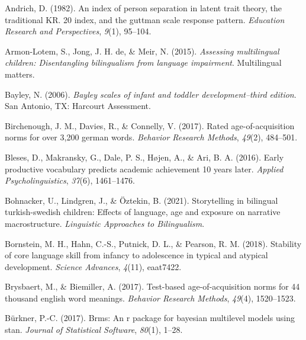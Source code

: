 \documentclass[
  man,floatsintext]{apa6}
\newlength{\cslhangindent}
\newlength{\cslentryspacingunit} %
\newenvironment{CSLReferences}[2] %
 {%
  \setlength{\parindent}{0pt}
  \ifodd #1
  \let\oldpar\par
  \def\par{\hangindent=\cslhangindent\oldpar}
  \fi
  \setlength{\parskip}{#2\cslentryspacingunit}
 }%
 {}
\begin{document}
\hypertarget{refs}{}
\begin{CSLReferences}{1}{0}
\leavevmode{}%
Andrich, D. (1982). An index of person separation in latent trait theory, the traditional KR. 20 index, and the guttman scale response pattern. \emph{Education Research and Perspectives}, \emph{9}(1), 95--104.

\leavevmode{}%
Armon-Lotem, S., Jong, J. H. de, \& Meir, N. (2015). \emph{Assessing multilingual children: Disentangling bilingualism from language impairment}. Multilingual matters.

\leavevmode{}%
Bayley, N. (2006). \emph{Bayley scales of infant and toddler development--third edition}. San Antonio, TX: Harcourt Assessment.

\leavevmode{}%
Birchenough, J. M., Davies, R., \& Connelly, V. (2017). Rated age-of-acquisition norms for over 3,200 german words. \emph{Behavior Research Methods}, \emph{49}(2), 484--501.

\leavevmode{}%
Bleses, D., Makransky, G., Dale, P. S., Højen, A., \& Ari, B. A. (2016). Early productive vocabulary predicts academic achievement 10 years later. \emph{Applied Psycholinguistics}, \emph{37}(6), 1461--1476.

\leavevmode{}%
Bohnacker, U., Lindgren, J., \& Öztekin, B. (2021). Storytelling in bilingual turkish-swedish children: Effects of language, age and exposure on narrative macrostructure. \emph{Linguistic Approaches to Bilingualism}.

\leavevmode{}%
Bornstein, M. H., Hahn, C.-S., Putnick, D. L., \& Pearson, R. M. (2018). Stability of core language skill from infancy to adolescence in typical and atypical development. \emph{Science Advances}, \emph{4}(11), eaat7422.

\leavevmode{}%
Brysbaert, M., \& Biemiller, A. (2017). Test-based age-of-acquisition norms for 44 thousand english word meanings. \emph{Behavior Research Methods}, \emph{49}(4), 1520--1523.

\leavevmode{}%
Bürkner, P.-C. (2017). Brms: An r package for bayesian multilevel models using stan. \emph{Journal of Statistical Software}, \emph{80}(1), 1--28.


\end{CSLReferences}
\end{document}
